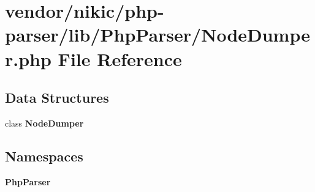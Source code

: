 \section{vendor/nikic/php-\/parser/lib/\+Php\+Parser/\+Node\+Dumper.php File Reference}
\label{_node_dumper_8php}
\subsection*{Data Structures}
\begin{DoxyCompactItemize}
\item 
class {\bf Node\+Dumper}
\end{DoxyCompactItemize}
\subsection*{Namespaces}
\begin{DoxyCompactItemize}
\item 
 {\bf Php\+Parser}
\end{DoxyCompactItemize}
